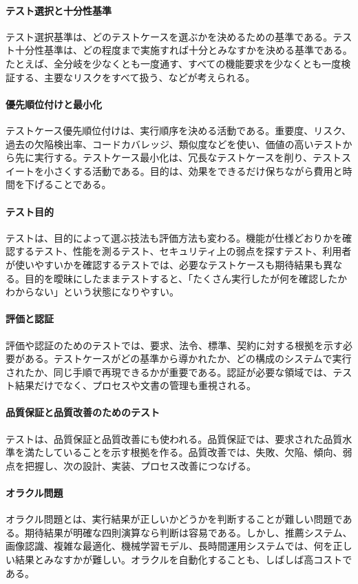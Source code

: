 \paragraph{テスト選択と十分性基準}
テスト選択基準は、どのテストケースを選ぶかを決めるための基準である。テスト十分性基準は、どの程度まで実施すれば十分とみなすかを決める基準である。たとえば、全分岐を少なくとも一度通す、すべての機能要求を少なくとも一度検証する、主要なリスクをすべて扱う、などが考えられる。

\paragraph{優先順位付けと最小化}
テストケース優先順位付けは、実行順序を決める活動である。重要度、リスク、過去の欠陥検出率、コードカバレッジ、類似度などを使い、価値の高いテストから先に実行する。テストケース最小化は、冗長なテストケースを削り、テストスイートを小さくする活動である。目的は、効果をできるだけ保ちながら費用と時間を下げることである。

\paragraph{テスト目的}
テストは、目的によって選ぶ技法も評価方法も変わる。機能が仕様どおりかを確認するテスト、性能を測るテスト、セキュリティ上の弱点を探すテスト、利用者が使いやすいかを確認するテストでは、必要なテストケースも期待結果も異なる。目的を曖昧にしたままテストすると、「たくさん実行したが何を確認したかわからない」という状態になりやすい。

\paragraph{評価と認証}
評価や認証のためのテストでは、要求、法令、標準、契約に対する根拠を示す必要がある。テストケースがどの基準から導かれたか、どの構成のシステムで実行されたか、同じ手順で再現できるかが重要である。認証が必要な領域では、テスト結果だけでなく、プロセスや文書の管理も重視される。

\paragraph{品質保証と品質改善のためのテスト}
テストは、品質保証と品質改善にも使われる。品質保証では、要求された品質水準を満たしていることを示す根拠を作る。品質改善では、失敗、欠陥、傾向、弱点を把握し、次の設計、実装、プロセス改善につなげる。

\paragraph{オラクル問題}
オラクル問題とは、実行結果が正しいかどうかを判断することが難しい問題である。期待結果が明確な四則演算なら判断は容易である。しかし、推薦システム、画像認識、複雑な最適化、機械学習モデル、長時間運用システムでは、何を正しい結果とみなすかが難しい。オラクルを自動化することも、しばしば高コストである。

